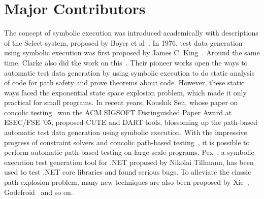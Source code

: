 \section{Major Contributors}
The concept of symbolic execution was introduced academically with descriptions of the Select system, proposed by Boyer et al~\cite{select}. In 1976, test data generation using symbolic execution was first proposed by James C. King~\cite{symbolic}. Around the same time, Clarke also did the work on this~\cite{system}. Their pioneer works open the ways to automatic test data generation by using symbolic execution to do static analysis of code for path safety and prove theorems about code. However, these static ways faced the exponential state space explosion problem, which made it only practical for small programs. In recent years, Koushik Sen, whose paper on concolic testing~\cite{dart} won the ACM SIGSOFT Distinguished Paper Award at ESEC/FSE '05, proposed CUTE and DART tools, blossoming up the path-based automatic test data generation using symbolic execution. With the impressive progress of constraint solvers and concolic path-based testing~\cite{extenjpf,structural,mixed,exe,fuzzing,pex}, it is possible to perform automatic path-based testing on large scale programs. Pex~\cite{pex}, a symbolic execution test generation tool for .NET proposed by Nikolai Tillmann, has been used to test .NET core libraries and found serious bugs. To alleviate the classic path explosion problem, many new techniques are also been proposed by Xie~\cite{fitness}, Godefroid~\cite{compositional} and so on.
